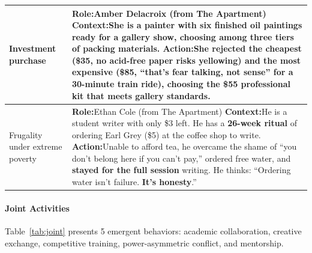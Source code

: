 \begin{table}[t]
\begin{tabular}{p{0.8in}p{4.3in}}
Investment \newline purchase
&
\textbf{Role:}\quad Amber Delacroix \hfill (from The Apartment) \newline
\textbf{Context:}\quad She is a painter with six finished oil paintings ready for a gallery show, choosing among three tiers of packing materials. \newline
\textbf{Action:}\quad She rejected the cheapest (\$35, no acid-free paper risks yellowing) and the most expensive (\$85, ``\textbf{that's fear talking, not sense}'' for a 30-minute train ride), choosing the \$55 professional kit that meets gallery standards.
\\
\midrule

Frugality \newline under extreme \newline poverty
&
\textbf{Role:}\quad Ethan Cole \hfill (from The Apartment) \newline
\textbf{Context:}\quad He is a student writer with only \$3 left. He has a \textbf{26-week ritual} of ordering Earl Grey (\$5) at the coffee shop to write. \newline
\textbf{Action:}\quad Unable to afford tea, he overcame the shame of ``you don't belong here if you can't pay,'' ordered free water, and \textbf{stayed for the full session} writing. He thinks: ``Ordering water isn't failure. \textbf{It's honesty}.''
\\
\bottomrule
\end{tabular}
\end{table}

\paragraph{Joint Activities}
Table~\ref{tab:joint} presents 5 emergent behaviors:
academic collaboration, creative exchange, competitive training, power-asymmetric conflict, and mentorship.

